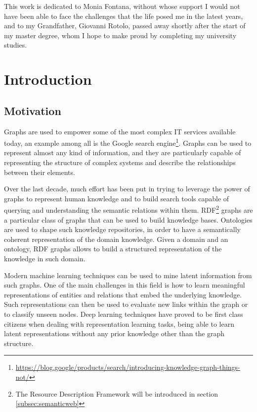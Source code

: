 \documentclass[%
    corpo=13.5pt,
    twoside,
    oldstyle,
    tipotesi=magistrale,
    greek,
    evenboxes
]{toptesi}
\begin{document}
This work is dedicated to Monia Fontana, without whose support I would not
have been able to face the challenges that the life posed me in the latest
years, and to my Grandfather, Giovanni Rotolo, passed away shortly after
the start of my master degree, whom I hope to make proud by completing my
university studies.

\tablespagetrue\figurespagetrue
\indici

\mainmatter

\chapter{Introduction}

\section{Motivation}

Graphs are used to empower some of the most complex IT services available
today, an example among all is the Google search engine\footnote{\url{https://blog.google/products/search/introducing-knowledge-graph-things-not/}}.
Graphs can be used to represent almost any kind of information, and they are
particularly capable of representing the structure of complex systems and
describe the relationships between their elements.

Over the last decade, much effort has been put in trying to leverage the power
of graphs to represent human knowledge and to build search tools capable of
querying and understanding the semantic relations within them.
RDF\footnote{The Resource Description Framework will be introduced in
section \ref{subsec:semanticweb}} graphs are a
particular class of graphs that can be used to build knowledge
bases. Ontologies are used to shape such knowledge repositories, in order to
have a semantically coherent representation of the domain knowledge.
Given a domain and an ontology, RDF graphs allows to build a structured
representation of the knowledge in such domain.

Modern machine learning techniques can be used to mine latent information
from such graphs. One of the main challenges in this field is how to learn
meaningful representations of entities and relations that embed
the underlying knowledge. Such representations can then be used to evaluate
new links within the graph or to classify unseen nodes.
Deep learning techniques have proved to be first class citizens when
dealing with representation learning tasks, being able to learn latent
representations without any prior knowledge other than the graph structure.
\end{document}
